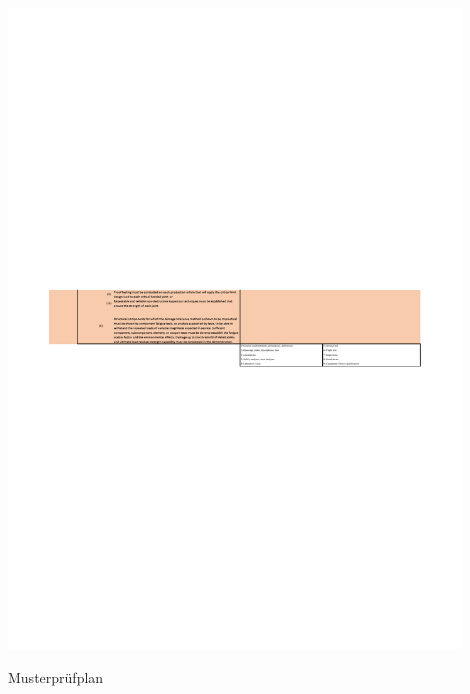 \begin{table}[H]
\centering
\includegraphics[width=0.9\textwidth]{bilder/Tabellen/MPP_Konstruktion_11.pdf}
\caption{Musterprüfplan} 
\label{tab:Musterprüfplan}
\end{table}


\section{}\label{}



